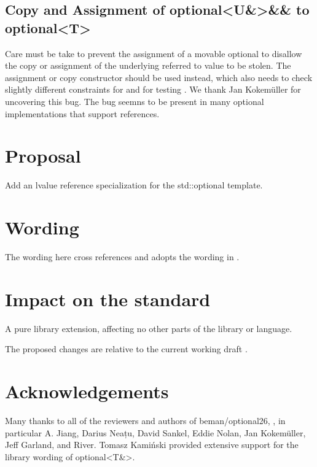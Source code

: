 \documentclass[a4paper,10pt,oneside,openany,final,article]{memoir}
\begin{document}
\section{Copy and Assignment of optional<U\&>\&\& to optional<T>}
Care must be take to prevent the assignment of a movable optional to disallow the copy or assignment of the underlying referred to value to be stolen. The  assignment or copy constructor should be used instead, which also needs to check slightly different constraints for  and for testing . We thank Jan Kokemüller for uncovering this bug. The bug seemns to be present in many optional implementations that support references.


\chapter{Proposal}

Add an lvalue reference specialization for the std::optional template.

\chapter{Wording}

The wording here cross references and adopts the wording in \cite{P3091R2}.


\begin{wording}



\end{wording}

\chapter{Impact on the standard}

A pure library extension, affecting no other parts of the library or language.

The proposed changes are relative to the current working draft \cite{N4910}.

\chapter{Acknowledgements}
Many thanks to all of the reviewers and authors of beman/optional26, \cite{The_Beman_Project_beman_optional26}, in particular A. Jiang, Darius Neațu, David Sankel, Eddie Nolan, Jan Kokemüller, Jeff Garland, and River. Tomasz Kamiński provided extensive support for the library wording of optional<T\&>.
\end{document}
